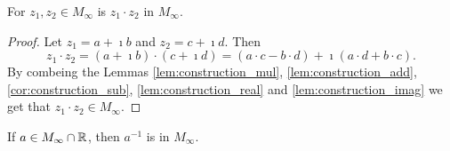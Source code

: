 \begin{corollary}
    \label{cor:construction_mul_complex}
    For $z_1, z_2 \in M_{\infty}$ is $z_1 \cdot z_2$ in $M_{\infty}$.
\end{corollary}
\begin{proof}
    Let $z_1 = a + \imath b$ and $z_2 = c + \imath d$. Then $$z_1 \cdot z_2 = (a + \imath b) \cdot (c + \imath d) = (a \cdot c - b \cdot d) + \imath (a \cdot d + b \cdot c).$$
    By combeing the Lemmas \ref{lem:construction_mul}, \ref{lem:construction_add}, \ref{cor:construction_sub}, \ref{lem:construction_real} and \ref{lem:construction_imag} we get that $z_1 \cdot z_2 \in M_{\infty}$.
\end{proof}

\begin{lemma}
    \label{lem:construction_inv}
    \leanok
    If $a \in M_{\infty}\cap\mathbb{R}$, then $a^{-1}$ is in  $M_{\infty}$.
\end{lemma}

